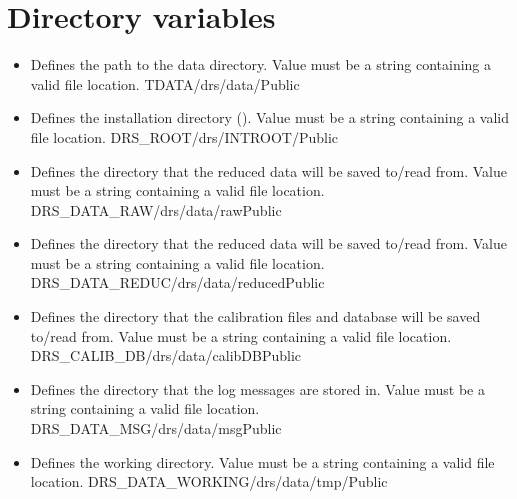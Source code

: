 \section{Directory variables}
\label{ch:variables:directory}

\begin{itemize}

\item {} 
{Defines the path to the data directory. Value must be a string containing a valid file location.}
{TDATA}{/drs/data/}{\AllRecipes}{\configtxtfile}{\spirouConst}{Public}

\item {} 
{Defines the installation directory (\InstallDIR). Value must be a string containing a valid file location.}
{DRS\_ROOT}{/drs/INTROOT/}{\AllRecipes}{\configtxtfile}{\spirouConst}{Public}


\item {} 
{Defines the directory that the reduced data will be saved to/read from. Value must be a string containing a valid file location.}
{DRS\_DATA\_RAW}{/drs/data/raw}{\AllRecipes}{\configtxtfile}{\spirouConst}{Public}


\item {} 
{Defines the directory that the reduced data will be saved to/read from. Value must be a string containing a valid file location.}
{DRS\_DATA\_REDUC}{/drs/data/reduced}{\AllRecipes}{\configtxtfile}{\spirouConst}{Public}


\item {} 
{Defines the directory that the calibration files and database will be saved to/read from. Value must be a string containing a valid file location.}
{DRS\_CALIB\_DB}{/drs/data/calibDB}{\AllRecipes}{\configtxtfile}{\spirouConst}{Public}


\item {} 
{Defines the directory that the log messages are stored in. Value must be a string containing a valid file location.}
{DRS\_DATA\_MSG}{/drs/data/msg}{\AllRecipes}{\configtxtfile}{\spirouConst}{Public}


\item {} 
{Defines the working directory. Value must be a string containing a valid file location.}
{DRS\_DATA\_WORKING}{/drs/data/tmp/}{\AllRecipes}{\configtxtfile}{\spirouConst}{Public}


\end{itemize}





